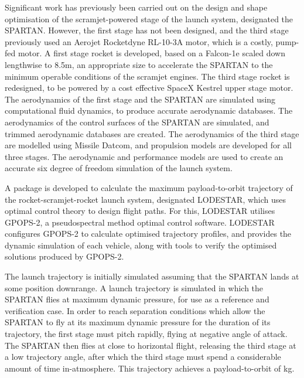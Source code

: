  Significant work has previously been carried out on the design and shape optimisation of the scramjet-powered stage of the launch system, designated the SPARTAN. 
 However, the first stage has not been designed, and the third stage previously used an Aerojet Rocketdyne RL-10-3A motor, which is a costly, pump-fed motor. 
 A first stage rocket is developed, based on a Falcon-1e scaled down lengthwise to 8.5m, an appropriate size to accelerate the SPARTAN to the minimum operable conditions of the scramjet engines. The third stage rocket is redesigned, to be powered by a cost effective SpaceX Kestrel upper stage motor. 
 The aerodynamics of the first stage and the SPARTAN are simulated using computational fluid dynamics, to produce accurate aerodynamic databases. The aerodynamics of the control surfaces of the SPARTAN are simulated, and trimmed aerodynamic databases are created.   
 The aerodynamics of the third stage are modelled using Missile Datcom, and propulsion models are developed for all three stages. The aerodynamic and performance models are used to create an accurate six degree of freedom simulation of the launch system. 
 
 A package is developed to calculate the maximum payload-to-orbit trajectory of the rocket-scramjet-rocket launch system, designated LODESTAR, which uses optimal control theory to design flight paths. For this, LODESTAR utilises GPOPS-2, a pseudospectral method optimal control software. LODESTAR configures GPOPS-2 to calculate optimised trajectory profiles, and provides the dynamic simulation of each vehicle, along with tools to verify the optimised solutions produced by GPOPS-2. 
 
 The launch trajectory is initially simulated assuming that the SPARTAN lands at some position downrange. A launch trajectory is simulated in which the SPARTAN flies at maximum dynamic pressure, for use as a reference and verification case. In order to reach separation conditions which allow the SPARTAN to fly at its maximum dynamic pressure for the duration of its trajectory, the first stage must pitch rapidly, flying at negative angle of attack. The SPARTAN then flies at close to horizontal flight, releasing the third stage at a low trajectory angle, after which the third stage must spend a considerable amount of time in-atmosphere. This trajectory achieves a payload-to-orbit of \PayloadToOrbitConstqNoReturn kg.  
 
